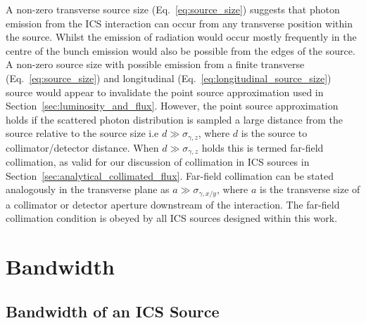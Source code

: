 \documentclass[../main.tex]{subfiles}
\begin{document}
A non-zero transverse source size (Eq.~\ref{eq:source_size}) suggests that photon emission from the ICS interaction can occur from any transverse position within the source. Whilst the emission of radiation would occur mostly frequently in the centre of the bunch emission would also be possible from the edges of the source. A non-zero source size with possible emission from a finite transverse (Eq.~\ref{eq:source_size}) and longitudinal (Eq.~\ref{eq:longitudinal_source_size}) source would appear to invalidate the point source approximation used in Section~\ref{sec:luminosity_and_flux}. However, the point source approximation holds if the scattered photon distribution is sampled a large distance from the source relative to the source size i.e $d \gg \sigma_{\gamma,z}$, where $d$ is the source to collimator/detector distance. When $d \gg \sigma_{\gamma,z}$ holds this is termed far-field collimation, as valid for our discussion of collimation in ICS sources in Section~\ref{sec:analytical_collimated_flux}. Far-field collimation can be stated analogously in the transverse plane as $a \gg \sigma_{\gamma,x/y}$, where $a$ is the transverse size of a collimator or detector aperture downstream of the interaction. The far-field collimation condition is obeyed by all ICS sources designed within this work.  

\section{Bandwidth}
\label{sec:bandwidth}

\subsection{Bandwidth of an ICS Source}
\end{document}
